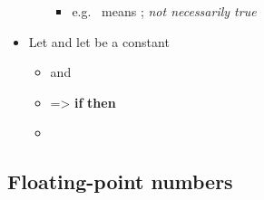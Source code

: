\begin{itemize}
\begin{itemize}
                \begin{itemize}

                  \item
                        e.g.~ means
                        ;
                        \emph{not necessarily true}
                \end{itemize}
        \end{itemize}
  \item
        Let  and let
         be a constant

        \begin{itemize}

          \item
                 and 
          \item
                =\textgreater{} \textbf{if}  \textbf{then}
          \item
        \end{itemize}
\end{itemize}

\subsection*{Floating-point numbers}

